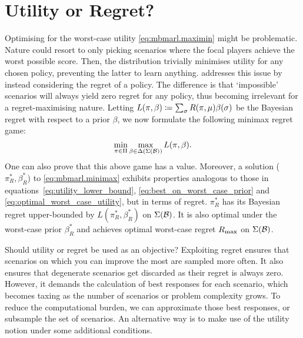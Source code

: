 \section{Utility or Regret?}
\label{seq:utility_or_regret}

Optimising for the worst-case utility \eqref{eq:mbmarl.maximin} might be problematic. Nature could resort to only picking scenarios where the focal players achieve the worst possible score. Then, the distribution trivially minimises utility for any chosen policy, preventing the latter to learn anything.
\citet{buening_minimax_bayes_reinforcement_2023} addresses this issue by instead considering the regret of a policy. The difference is that ‘impossible’ scenarios will always yield zero regret for any policy, thus becoming irrelevant for a regret-maximising nature. Letting $L(\pi, \beta) \coloneqq \sum_\sigma R(\pi, \mu) \beta(\sigma)$ be the Bayesian regret with respect to a prior $\beta$, we now formulate the following minimax regret game:
\begin{equation}
    \label{eq:mbmarl.minimax}
    \min_{\pi \in \Pi} \max_{\beta \in \Delta(\Sigma(\mathcal{B}))} L(\pi, \beta).
\end{equation}
One can also prove that this above game has a value. Moreover, a solution  ($\pi^*_R, \beta^*_R$) to \eqref{eq:mbmarl.minimax} exhibits properties analogous to those in equations~\eqref{eq:utility_lower_bound}, \eqref{eq:best_on_worst_case_prior} and \eqref{eq:optimal_worst_case_utility}, but in terms of regret. $\pi^*_R$ has its Bayesian regret upper-bounded by $L(\pi^*_R, \beta^*_R)$ on $\Sigma(\mathcal{B})$. It is also optimal under the worst-case prior $\beta^*_R$ and achieves optimal worst-case regret $R_\text{max}$ on $\Sigma(\mathcal{B})$.

Should utility or regret be used as an objective? Exploiting regret ensures that scenarios on which you can improve the most are sampled more often. It also ensures that degenerate scenarios get discarded as their regret is always zero. However, it demands the calculation of best responses for each scenario, which becomes taxing as the number of scenarios or problem complexity grows.
To reduce the computational burden, we can approximate those best responses, or subsample the set of scenarios.
An alternative way is to make use of the utility notion under some additional conditions.

